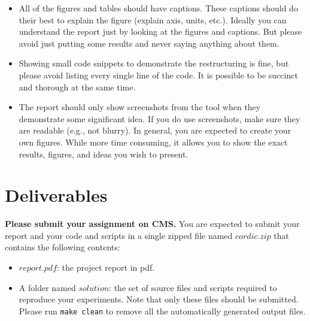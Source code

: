 \documentclass[paper=letter, fontsize=11.6pt]{scrartcl} %
\numberwithin{equation}{section} %
\numberwithin{figure}{section} %
\numberwithin{table}{section} %
\begin{document}
\begin{itemize}
	\item All of the figures and tables should have captions. These captions should do their best to  explain the figure (explain axis, units, etc.). Ideally you can understand the report just by looking at the figures and captions. But please avoid just putting some results and never saying anything about them.

	\item Showing small code snippets to demonstrate the restructuring is fine, but please avoid listing every single line of the code.
	It is possible to be succinct and thorough at the same time.

	\item The report should only show screenshots from the tool when they demonstrate some significant idea. If you do use screenshots, make sure they are readable (e.g., not blurry). In general, you are expected to create your own figures. While more time consuming, it allows you to show the exact results, figures, and ideas you wish to present.

\end{itemize}

\section{Deliverables}
\label{deliverables}
\textbf{Please submit your assignment on CMS.} You are expected to submit your report and your code and scripts in a single zipped file named \textbf{$cordic.zip$} that contains the following contents:
\begin{itemize}
	\item $report.pdf$: the project report in pdf.
	\item A folder named $solution$: the set of source files and scripts required to reproduce your experiments.
	Note that only these files should be submitted. Please run \texttt{make clean} to remove all the automatically generated output files.
\end{itemize}
\end{document}
